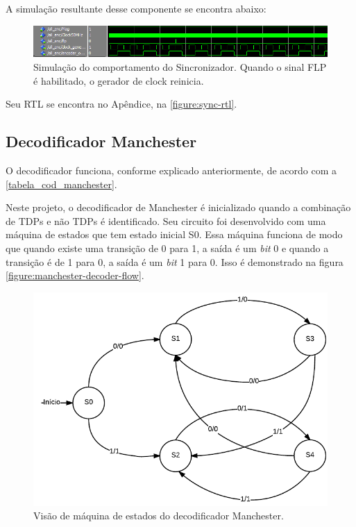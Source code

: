 	A simulação resultante desse componente se encontra abaixo:
	\begin{figure}[h]
		\caption{\label{figure:sync-simulation}Simulação do comportamento do Sincronizador. Quando o sinal FLP é habilitado, o gerador de clock reinicia.}
		\centering
		\includegraphics[width=1\textwidth]{sync/simulation.png}
	\end{figure}

	Seu RTL se encontra no Apêndice, na \autoref{figure:sync-rtl}.

	\subsection{Decodificador Manchester}

	O decodificador funciona, conforme explicado anteriormente, de acordo com a \autoref{tabela_cod_manchester}.

	Neste projeto, o decodificador de Manchester é inicializado quando a combinação de TDPs e não TDPs é identificado. Seu circuito foi desenvolvido com uma máquina de estados que tem estado inicial S0. Essa máquina funciona de modo que quando existe uma transição de 0 para 1, a saída é um \textit{bit} 0 e quando a transição é de 1 para 0, a saída é um \textit{bit} 1 para 0. Isso é demonstrado na figura \autoref{figure:manchester-decoder-flow}.

	\begin{figure}[h]
		\caption{\label{figure:manchester-decoder-flow}Visão de máquina de estados do decodificador Manchester.}
		\centering
		\includegraphics[width=0.25\textheight]{manchester/decoder-flow.pdf}
	\end{figure}

